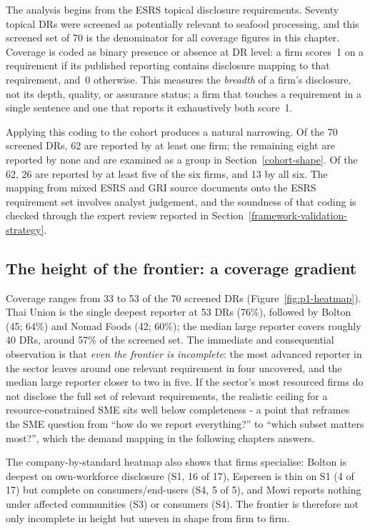 \documentclass[
]{article}
\newcounter{none} %
\begin{document}
The analysis begins from the ESRS topical disclosure requirements. Seventy
topical DRs were screened as potentially relevant to seafood processing,
and this screened set of 70 is the denominator for all coverage figures in
this chapter. Coverage is coded as binary presence or absence at DR level:
a firm scores~1 on a requirement if its published reporting contains
disclosure mapping to that requirement, and~0 otherwise. This measures the
\emph{breadth} of a firm's disclosure, not its depth, quality, or
assurance status; a firm that touches a requirement in a single sentence
and one that reports it exhaustively both score~1.

Applying this coding to the cohort produces a natural narrowing. Of the 70
screened DRs, 62 are reported by at least one firm; the remaining eight are
reported by none and are examined as a group in
Section~\ref{cohort-shape}. Of the 62, 26 are reported by at least five of
the six firms, and 13 by all six. The mapping from mixed ESRS and GRI
source documents onto the ESRS requirement set involves analyst judgement,
and the soundness of that coding is checked through the expert review
reported in Section~\ref{framework-validation-strategy}.

\subsection{The height of the frontier: a coverage
gradient}\label{cohort-gradient}

Coverage ranges from 33 to 53 of the 70 screened DRs
(Figure~\ref{fig:p1-heatmap}). Thai Union is the single deepest reporter
at 53 DRs (76\%), followed by Bolton (45; 64\%) and Nomad Foods (42;
60\%); the median large reporter covers roughly 40 DRs, around 57\% of the
screened set. The immediate and consequential observation is that
\emph{even the frontier is incomplete}: the most advanced reporter in the
sector leaves around one relevant requirement in four uncovered, and the
median large reporter closer to two in five. If the sector's most
resourced firms do not disclose the full set of relevant requirements, the
realistic ceiling for a resource-constrained SME sits well below
completeness - a point that reframes the SME question from ``how do we
report everything?'' to ``which subset matters most?'', which the demand
mapping in the following chapters answers.

The company-by-standard heatmap also shows that firms specialise: Bolton
is deepest on own-workforce disclosure (S1, 16 of 17), Espersen is thin on
S1 (4 of 17) but complete on consumers/end-users (S4, 5 of 5), and Mowi
reports nothing under affected communities (S3) or consumers (S4). The
frontier is therefore not only incomplete in height but uneven in shape
from firm to firm.
\end{document}
